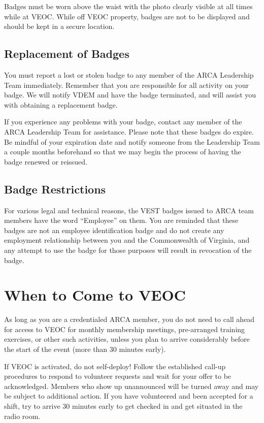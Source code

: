 \documentclass[pdflatex,letterpaper,twoside,12pt]{book}
\begin{document}
Badges must be worn above the waist with the photo clearly visible at all times while at VEOC.  While off VEOC property, badges are not to be displayed and should be kept in a secure location.

\subsection{Replacement of Badges}

You must report a lost or stolen badge to any member of the ARCA Leadership Team immediately.  Remember that you are responsible for all activity on your badge.  We will notify VDEM and have the badge terminated, and will assist you with obtaining a replacement  badge.

If you experience any problems with your badge, contact any member of the ARCA Leadership Team for assistance.  Please note that these badges do expire.  Be mindful of your expiration date and notify someone from the Leadership Team a couple months beforehand so that we may begin the process of having the badge renewed or reissued.

\subsection{Badge Restrictions}

For various legal and technical reasons, the VEST badges issued to ARCA team members have the word ``Employee'' on them.  You are reminded that these badges are not an employee identification badge and do not create any employment relationship between you and the Commonwealth of Virginia, and any attempt to use the badge for those purposes will result in revocation of the badge.


\section{When to Come to VEOC}

As long as you are a credentialed ARCA member, you do not need to call ahead for access to VEOC for monthly membership meetings, pre-arranged training exercises, or other such activities, unless you plan to arrive considerably before the start of the event (more than 30 minutes early).

If VEOC is activated, do not self-deploy!  Follow the established call-up procedures to respond to volunteer requests and wait for your offer to be acknowledged.  Members who show up unannounced will be turned away and may be subject to additional action.  If you have volunteered and been accepted for a shift, try to arrive 30 minutes early to get checked in and get situated in the radio room.
\end{document}
